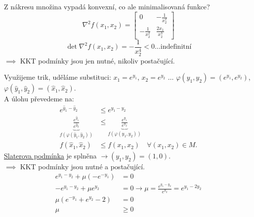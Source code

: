 \begin{multicols}{2}

\columnbreak

    Z nákresu množina vypadá konvexní, co ale minimalisovaná funkce?
    \[
        \nabla^2 f(x_1, x_2) = 
        \begin{bmatrix}
            0 & -\frac{1}{x^2_2} \\
            -\frac{1}{x^2_2} & \frac{2x_1}{x^3_2}    
        \end{bmatrix}
    \]
    \[
        \det \nabla^2 f(x_1, x_2) = -\frac{1}{x^4_2} < 0 \dots \text{indefinitní}
    \]
    $\implies$ KKT podmínky jsou jen nutné, nikoliv postačující.
\end{multicols}
Využijeme trik, uděláme substituci: $x_1 = e^{y_1}$, $x_2 = e^{y_2}$ $\dots$ $\varphi(y_1, y_2) = (e^{y_1}, e^{y_2})$,
$\varphi(\hat y_1, \hat y_2) = (\hat x_1, \hat x_2)$.\\
A úlohu převedeme na:
\begin{align*}
    e^{\hat y_1 - \hat y_2} &\leq e^{y_1 - y_2} \\
    \underbrace{\frac{e^{\hat y_1}}{e^{\hat y_2}}}_{f(\varphi(\hat y_1, \hat y_2))} &\leq 
    \underbrace{\frac{e^{y_1}}{e^{y_2}}}_{f(\varphi(y_1, y_2))} \\
    f(\hat x_1, \hat x_2) &\leq f(x_1, x_2) \quad \forall (x_1, x_2) \in M.
\end{align*}
\hyperref[slaterPodm]{Slaterova podmínka} je splněna $\rightarrow (y_1, y_2) = (1, 0)$.\\
$\implies$ KKT podmínky jsou nutné a postačující.
\begingroup
\setcounter{equation}{0}
\renewcommand{\theequation}{\Roman{equation}}
\begin{align}
    e^{y_1 - y_2} + \mu(-e^{-y_1}) &= 0 \\
    -e^{y_1 - y_2} + \mu e^{y_2} &= 0 \rightarrow \mu = \frac{e^{y_1 - y_2}}{e^{y_2}} = e^{y_1 - 2y_2} \\
    \mu(e^{-y_1} + e^{y_2} - 2) &= 0 \\
    \mu &\geq 0
\end{align}
